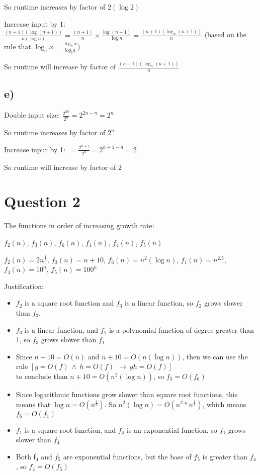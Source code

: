 \documentclass{article}
\begin{document}
So runtime increases by factor of $2 (\log 2)$

Increase input by 1: $\frac{(n+1)(\log (n+1))}{n (\log n)} = \frac{(n+1)}{n} \times \frac{\log(n+1)}{\log n} = \frac{(n+1)(\log_{n}(n+1))}{n}$ (based on the rule that $\log_{a}x = \frac{\log_{b}x}{log_{b}a}$)

So runtime will increase by factor of $\frac{(n+1)(\log_{n}(n+1))}{n}$

\subsection*{e)}
Double input size: $\frac{2^{2n}}{2^n} = 2^{2n-n} = 2^n$

So runtime increases by factor of $2^n$

Increase input by 1: $\frac{}{} = \frac{2^{n+1}}{2^n} = 2^{n+1-n} = 2$

So runtime will increase by factor of $2$



\section*{Question 2}

The functions in order of increasing growth rate:

$f_2(n)$, $f_3(n)$, $f_6(n)$, $f_1(n)$, $f_4(n)$, $f_5(n)$

$f_2(n) = 2n^{\frac{1}{2}}$, $f_3(n) = n+10$, $f_6(n) = n^2(\log n)$, $f_1(n) = n^{2.5}$,  $f_4(n) = 10^n$, $f_5(n) = 100^n$

Justification:
\begin{itemize}
    \item $f_2$ is a square root function and $f_3$ is a linear function, so $f_2$ grows slower than $f_3$.
    \item $f_3$ is a linear function, and $f_1$ is a polynomial function of degree greater than 1, so $f_3$ grows slower than $f_1$
    \item Since $n+10 = O(n)$ and $n+10 = O(n (\log n))$, then we can use the rule $[g = O(f) \ \land \ h = O(f) \ \ \rightarrow{} \ gh = O(f)]$ \\ to conclude than $n+10 = O(n^2(\log n))$, so $f_3 = O(f_6)$
    \item Since logarithmic functions grow slower than square root functions, this means that $\log n = O(n^{\frac{1}{2}})$. So $n^2(\log n) = O(n^2*n^{\frac{1}{2}})$, which means $f_6 = O(f_1)$ 
    \item $f_1$ is a square root function, and $f_4$ is an exponential function, so $f_1$ grows slower than $f_4$
    \item Both f$_4$ and $f_5$ are exponential functions, but the base of $f_5$ is greater than $f_4$, so $f_4 = O(f_5)$
\end{itemize}
\end{document}
